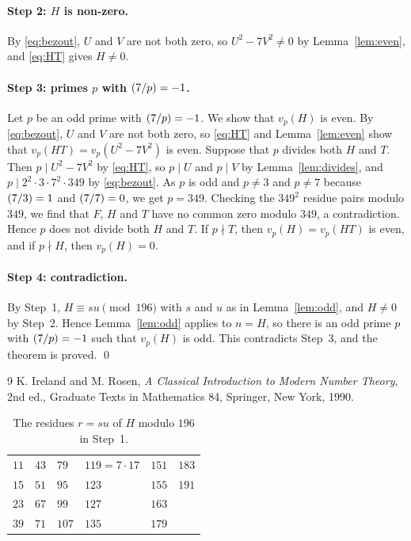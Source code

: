 \documentclass[11pt]{article}
\newcommand{\leg}[2]{\mathchoice{\biggl(\dfrac{#1}{#2}\biggr)}{(#1/#2)}{(#1/#2)}{(#1/#2)}}
\begin{document}
\paragraph{Step 2: $H$ is non-zero.} By \eqref{eq:bezout}, $U$ and $V$ are not both zero, so $U^2-7V^2\neq0$ by Lemma~\ref{lem:even}, and \eqref{eq:HT} gives $H\neq0$.

\paragraph{\texorpdfstring{Step 3: primes $p$ with $\leg{7}{p}=-1$.}{Step 3: inert primes.}} Let $p$ be an odd prime with $\leg{7}{p}=-1$. We show that $v_p(H)$ is even. By \eqref{eq:bezout}, $U$ and $V$ are not both zero, so \eqref{eq:HT} and Lemma~\ref{lem:even} show that $v_p(HT)=v_p(U^2-7V^2)$ is even. Suppose that $p$ divides both $H$ and $T$. Then $p\mid U^2-7V^2$ by \eqref{eq:HT}, so $p\mid U$ and $p\mid V$ by Lemma~\ref{lem:divides}, and $p\mid 2^{2}\cdot 3\cdot 7^{2}\cdot 349$ by \eqref{eq:bezout}. As $p$ is odd and $p\neq3$ and $p\neq7$ because $\leg{7}{3}=1$ and $\leg{7}{7}=0$, we get $p=349$. Checking the $349^2$ residue pairs modulo $349$, we find that $F$, $H$ and $T$ have no common zero modulo $349$, a contradiction. Hence $p$ does not divide both $H$ and $T$. If $p\nmid T$, then $v_p(H)=v_p(HT)$ is even, and if $p\nmid H$, then $v_p(H)=0$.

\paragraph{Step 4: contradiction.} By Step~1, $H\equiv su\pmod{196}$ with $s$ and $u$ as in Lemma~\ref{lem:odd}, and $H\neq0$ by Step~2. Hence Lemma~\ref{lem:odd} applies to $n=H$, so there is an odd prime $p$ with $\leg{7}{p}=-1$ such that $v_p(H)$ is odd. This contradicts Step~3, and the theorem is proved.
\qed

\begin{thebibliography}{9}
 K. Ireland and M. Rosen, \emph{A Classical Introduction to Modern Number Theory}, 2nd ed., Graduate Texts in Mathematics 84, Springer, New York, 1990.
\end{thebibliography}

\begin{table}[ht]
\centering\footnotesize
\caption{The residues $r=su$ of $H$ modulo $196$ in Step~1.}\label{tab:res}
\begin{tabular}{llllll}
\hline
$11$ & $43$ & $79$ & $119=7\cdot17$ & $151$ & $183$\\
$15$ & $51$ & $95$ & $123$ & $155$ & $191$\\
$23$ & $67$ & $99$ & $127$ & $163$ & \\
$39$ & $71$ & $107$ & $135$ & $179$ & \\
\hline
\end{tabular}
\end{table}
\end{document}
